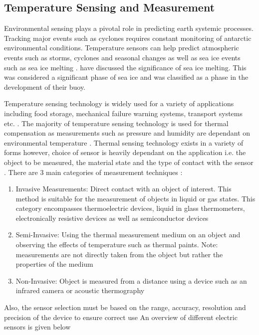 \subsection{Temperature Sensing and Measurement}

Environmental sensing plays a pivotal role in predicting earth systemic processes. Tracking major events such as cyclones \cite{vichi2019effects} requires constant monitoring of antarctic environmental conditions. Temperature sensors can help predict atmospheric events such as storms, cyclones and seasonal changes as well as sea ice events such as sea ice melting \cite{kohout2015device} \cite{doble2017robust}. \textcite{doble2017robust} have discussed the significance of sea ice melting. This was considered a significant phase of sea ice and was classified as a phase in the development of their buoy. \par 

Temperature sensing technology is widely used for a variety of applications including food storage, mechanical failure warning systems, transport systems etc. \cite{awtrey2002environmental}. The majority of temperature sensing technology is used for thermal compensation as measurements such as pressure and humidity are dependant on environmental temperature \cite{mansoor2015silicon}. Thermal sensing technology exists in a variety of forms however, choice of sensor is heavily dependant on the application i.e. the object to be measured, the material state and the type of contact with the sensor \cite{mansoor2015silicon}\cite{childs2000review}. There are 3 main categories of measurement techniques \cite{childs2000review}:
\begin{enumerate}
	\item Invasive Measurements: Direct contact with an object of interest. This method is suitable for the measurement of objects in liquid or gas states. This category encompasses thermoelectric devices, liquid in glass thermometers, electronically resistive devices as well as semiconductor devices \cite{mansoor2015silicon}
	\item Semi-Invasive: Using the thermal measurement medium on an object and observing the effects of temperature such as thermal paints. Note: measurements are not directly taken from the object but rather the properties of the medium
	\item Non-Invasive: Object is measured from a distance using a device such as an infrared camera or acoustic thermography
\end{enumerate}
Also, the sensor selection must be based on the range, accuracy, resolution and precision of the device to ensure correct use An overview of different electric sensors is given below \cite{childs2000review}
